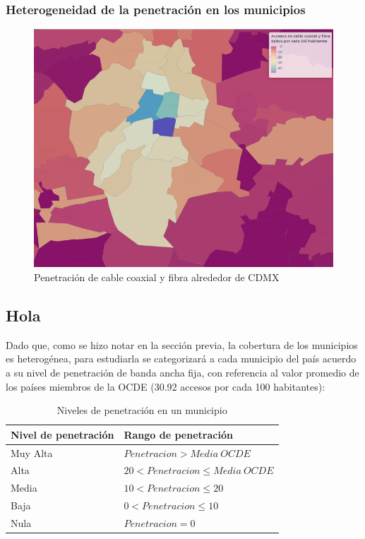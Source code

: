 \documentclass[9pt,twocolumn,twoside]{ilcss}
\begin{document}
\subsubsection{Heterogeneidad de la penetración en los municipios}

\begin{figure}[tbhp]
\centering
\includegraphics[width=0.9\linewidth]{images/pen_habs_cdmx.png}
\caption{Penetración de cable coaxial y fibra alrededor de CDMX}
\label{fig:pen_habs_cdmx}
\end{figure}

\subsection{Hola}

Dado que, como se hizo notar en la sección previa, la cobertura de los municipios es heterogénea, para estudiarla se categorizará a cada municipio del país acuerdo a su nivel de penetración de banda ancha fija, con referencia al valor promedio de los países miembros de la OCDE (30.92 accesos por cada 100 habitantes):
\begin{table}[tbhp]
	\centering
	\caption{Niveles de penetración en un municipio\label{table:clasifpen}}
	\begin{tabular}{@{}ll@{}}
		\toprule
		Nivel de penetración & Rango  de penetración            \\ \midrule
		Muy Alta  & $Penetracion > Media \ OCDE$         \\ 
		Alta    & $20 < Penetracion \leq Media \ OCDE$ \\ 
		Media    & $10 < Penetracion \leq 20$  \\ 
		Baja      & $0 < Penetracion \leq 10$  \\ 
		Nula      & $Penetracion =0$            \\ \bottomrule
	\end{tabular}
\end{table}
\end{document}
